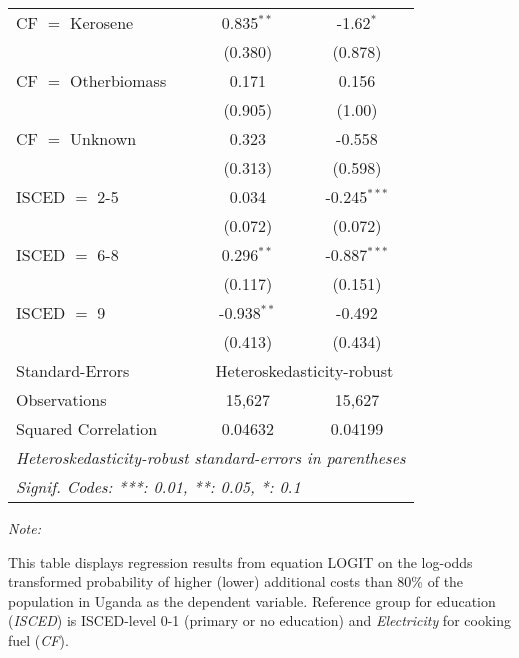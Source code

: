 \begin{table}[htbp!]
\begin{adjustbox}{width = 1\textwidth, max height = 0.95\textheight, center}
\begin{threeparttable}[b]
\begin{tabular}{lcc}
            CF $=$ Kerosene      & 0.835$^{**}$   & -1.62$^{*}$\\   
                                 & (0.380)        & (0.878)\\   
            CF $=$ Otherbiomass  & 0.171          & 0.156\\   
                                 & (0.905)        & (1.00)\\   
            CF $=$ Unknown       & 0.323          & -0.558\\   
                                 & (0.313)        & (0.598)\\   
            ISCED $=$ 2-5        & 0.034          & -0.245$^{***}$\\   
                                 & (0.072)        & (0.072)\\   
            ISCED $=$ 6-8        & 0.296$^{**}$   & -0.887$^{***}$\\   
                                 & (0.117)        & (0.151)\\   
            ISCED $=$ 9          & -0.938$^{**}$  & -0.492\\   
                                 & (0.413)        & (0.434)\\   
            \midrule 
            Standard-Errors & \multicolumn{2}{c}{Heteroskedasticity-robust} \\ 
            Observations         & 15,627         & 15,627\\  
            Squared Correlation  & 0.04632        & 0.04199\\  
            \midrule \midrule
            \multicolumn{3}{l}{\emph{Heteroskedasticity-robust standard-errors in parentheses}}\\
            \multicolumn{3}{l}{\emph{Signif. Codes: ***: 0.01, **: 0.05, *: 0.1}}\\
         \end{tabular}
         
         \begin{tablenotes}\item \medskip \textit{Note:}
            \item This table displays regression results from equation LOGIT on the log-odds transformed probability of higher (lower) additional costs than 80\% of the population in Uganda as the dependent variable. Reference group for education (\textit{ISCED}) is ISCED-level 0-1 (primary or no education) and \textit{Electricity} for cooking fuel (\textit{CF}).
         \end{tablenotes}
      \end{threeparttable}
   \end{adjustbox}
\end{table}


